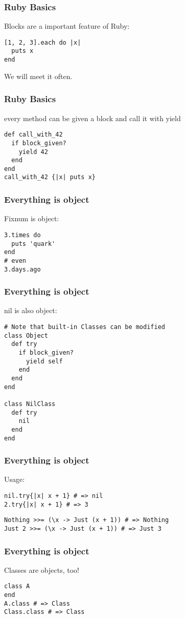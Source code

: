 \documentclass[11pt]{beamer}
\begin{document}
\begin{frame}[fragile]
\frametitle{Ruby Basics}
Blocks are a important feature of Ruby:
\begin{verbatim}
[1, 2, 3].each do |x|
  puts x
end
\end{verbatim}
We will meet it often.
\end{frame}

\begin{frame}[fragile]
\frametitle{Ruby Basics}
every method can be given a block and call it with yield
\begin{verbatim}
def call_with_42
  if block_given?
    yield 42
  end
end
call_with_42 {|x| puts x}
\end{verbatim}
\end{frame}

\begin{frame}[fragile]
\frametitle{Everything is object}
Fixnum is object:
\begin{verbatim}
3.times do
  puts 'quark'
end
# even
3.days.ago
\end{verbatim}
\end{frame}

\begin{frame}[fragile]
\frametitle{Everything is object}
nil is also object:
\begin{verbatim}
# Note that built-in Classes can be modified
class Object
  def try
    if block_given?
      yield self
    end
  end
end

class NilClass
  def try
    nil
  end
end
\end{verbatim}
\end{frame}

\begin{frame}[fragile]
\frametitle{Everything is object}
Usage:
\begin{verbatim}
nil.try{|x| x + 1} # => nil
2.try{|x| x + 1} # => 3
\end{verbatim}
\begin{verbatim}
Nothing >>= (\x -> Just (x + 1)) # => Nothing
Just 2 >>= (\x -> Just (x + 1)) # => Just 3
\end{verbatim}
\end{frame}

\begin{frame}[fragile]
\frametitle{Everything is object}
Classes are objects, too!
\begin{verbatim}
class A
end
A.class # => Class
Class.class # => Class
\end{verbatim}
\end{frame}
\end{document}
